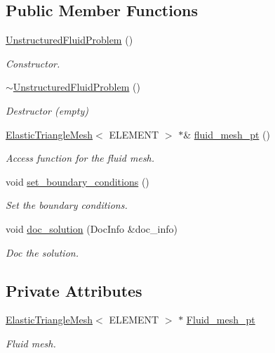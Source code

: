 \subsection*{Public Member Functions}
\begin{DoxyCompactItemize}
\item 
\hyperlink{classUnstructuredFluidProblem_a9751f4afac540e148b3d90ae43dd5187}{Unstructured\+Fluid\+Problem} ()
\begin{DoxyCompactList}\small\item\em Constructor. \end{DoxyCompactList}\item 
\hyperlink{classUnstructuredFluidProblem_a4d660faa6bae35197a4ea73139ac9963}{$\sim$\+Unstructured\+Fluid\+Problem} ()
\begin{DoxyCompactList}\small\item\em Destructor (empty) \end{DoxyCompactList}\item 
\hyperlink{classElasticTriangleMesh}{Elastic\+Triangle\+Mesh}$<$ E\+L\+E\+M\+E\+NT $>$ $\ast$\& \hyperlink{classUnstructuredFluidProblem_abc5f7e9929eb6f174eaa49a491489ad9}{fluid\+\_\+mesh\+\_\+pt} ()
\begin{DoxyCompactList}\small\item\em Access function for the fluid mesh. \end{DoxyCompactList}\item 
void \hyperlink{classUnstructuredFluidProblem_a4e57ba31d35b62c9c657c1cfd822ecde}{set\+\_\+boundary\+\_\+conditions} ()
\begin{DoxyCompactList}\small\item\em Set the boundary conditions. \end{DoxyCompactList}\item 
void \hyperlink{classUnstructuredFluidProblem_abcc9f0065665ae5239988b1a812e3f78}{doc\+\_\+solution} (Doc\+Info \&doc\+\_\+info)
\begin{DoxyCompactList}\small\item\em Doc the solution. \end{DoxyCompactList}\end{DoxyCompactItemize}
\subsection*{Private Attributes}
\begin{DoxyCompactItemize}
\item 
\hyperlink{classElasticTriangleMesh}{Elastic\+Triangle\+Mesh}$<$ E\+L\+E\+M\+E\+NT $>$ $\ast$ \hyperlink{classUnstructuredFluidProblem_a9b653c3879c846b412068d03bfe8c202}{Fluid\+\_\+mesh\+\_\+pt}
\begin{DoxyCompactList}\small\item\em Fluid mesh. \end{DoxyCompactList}\end{DoxyCompactItemize}


